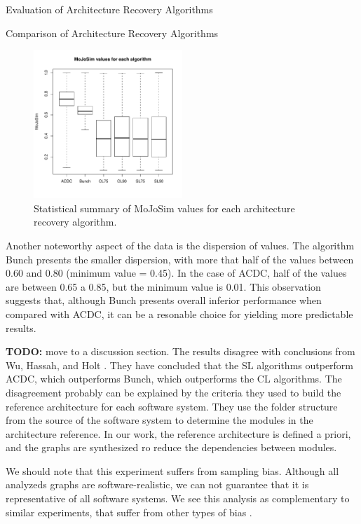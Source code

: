 \documentclass[11pt,twocolumn,a4paper,english]{article}
\newcommand{\TODO}{\textbf{TODO:} }
\begin{document}
\begin{section}{Evaluation of Architecture Recovery Algorithms}
\begin{subsection}{Comparison of Architecture Recovery Algorithms}
	\begin{figure}[htbp]
		\centering
			\includegraphics[width=0.5\textwidth]{figures/exp-algorithms}
		\caption{Statistical summary of MoJoSim values for each architecture recovery algorithm.}
		\label{fig:exp-algorithms}
	\end{figure}
	
	Another noteworthy aspect of the data is the dispersion of values. The algorithm Bunch presents the smaller dispersion, with more that half of the values between 0.60 and 0.80 (minimum value = 0.45). In the case of ACDC, half of the values are between 0.65 a 0.85, but the minimum value is 0.01. This observation suggests that, although Bunch presents overall inferior performance when compared with ACDC, it can be a resonable choice for yielding more predictable results.
	
	\TODO move to a discussion section.
	The results disagree with conclusions from Wu, Hassah, and Holt \cite{Wu2005}. They have concluded that the SL algorithms outperform ACDC, which outperforms Bunch, which outperforms the CL algorithms. The disagreement probably can be explained by the criteria they used to build the reference architecture for each software system. They use the folder structure from the source of the software system to determine the modules in the architecture reference. In our work, the reference architecture is defined a priori, and the graphs are synthesized ro reduce the dependencies between modules.
	
	We should note that this experiment suffers from sampling bias. Although all analyzeds graphs are software-realistic, we can not guarantee that it is representative of all software systems. We see this analysis as complementary to similar experiments, that suffer from other types of bias \cite{Wu2005,Bittencourt2009,Andritsos2005}.
	
\end{subsection}	


\end{section}
\end{document}
